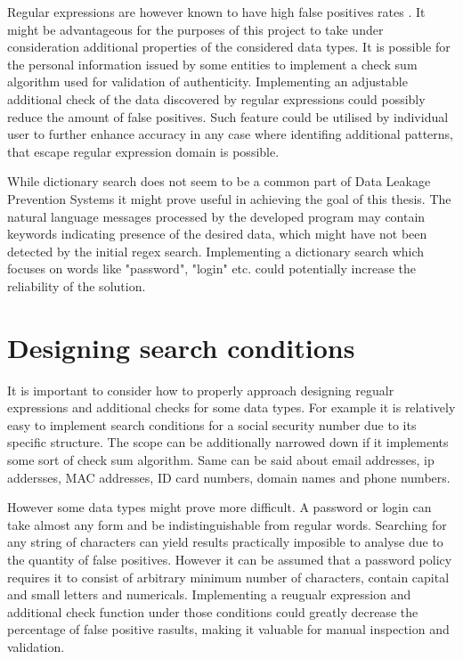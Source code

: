 \documentclass[a4paper,twoside,12pt]{book}
\begin{document}
Regular expressions are however known to have high false positives rates \cite{bib:articleDLPS}. It might be advantageous for the purposes of this project 
to take under consideration additional properties of the considered data types. It is possible for the personal information issued
by some entities to implement a check sum algorithm used for validation of authenticity. Implementing an adjustable additional check 
of the data discovered by regular expressions could possibly reduce the amount of false positives. Such feature could be utilised by 
individual user to further enhance accuracy in any case where identifing additional patterns, that escape regular expression domain is possible.

While dictionary search does not seem to be a common part of Data Leakage Prevention Systems it might prove useful in achieving the goal of this thesis.
The natural language messages processed by the developed program may contain keywords indicating presence of the desired data, which might have not been 
detected by the initial regex search. Implementing a dictionary search which focuses on words like "password", "login" etc. could potentially increase the
reliability of the solution. 

\section{Designing search conditions}

It is important to consider how to properly approach designing regualr expressions and additional checks for some data types. 
For example it is relatively easy to implement search conditions for a social security number due to its specific structure.
The scope can be additionally narrowed down if it implements some sort of check sum algorithm. Same can be said about 
email addresses, ip addersses, MAC addresses, ID card numbers, domain names and phone numbers.

However some data types might prove more difficult. A password or login can take almost any form and be indistinguishable from regular words.
Searching for any string of characters can yield results practically imposible to analyse due to the quantity of false positives. 
However it can be assumed that a password policy requires it to consist of arbitrary minimum number of characters, contain 
capital and small letters and numericals. Implementing a reugualr expression and additional check function under those conditions
could greatly decrease the percentage of false positive rasults, making it valuable for manual inspection and validation.
\end{document}
